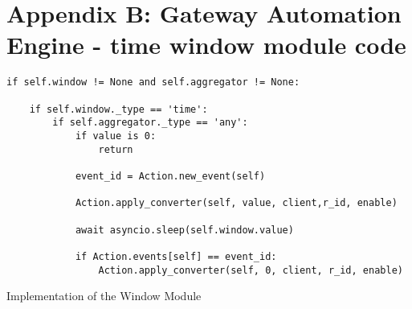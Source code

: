 \chapter{Appendix B: Gateway Automation Engine - time window module code}
\label{chapter:appendix-b}

\begin{listing}[H]
	\begin{verbatim}
if self.window != None and self.aggregator != None:

    if self.window._type == 'time':
        if self.aggregator._type == 'any':
            if value is 0:
                return

            event_id = Action.new_event(self)

            Action.apply_converter(self, value, client,r_id, enable)

            await asyncio.sleep(self.window.value)

            if Action.events[self] == event_id:
                Action.apply_converter(self, 0, client, r_id, enable)
	\end{verbatim}
	\caption{Implementation of the Window Module}
	\label{snippet:rule}
\end{listing}
